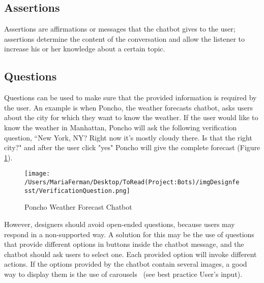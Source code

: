 \documentclass[a4paper,10pt]{article}
\begin{document}
\subsection{Assertions}
Assertions are affirmations or messages that the chatbot gives to the user; assertions determine the content of the conversation and allow the listener to increase his or her knowledge about a certain topic. 

\subsection{Questions}
Questions can be used to make sure that the provided information is required by the user. An example is when Poncho, the weather forecasts chatbot, asks users about the city for which they want to know the weather. If the user would like to know the weather in Manhattan, Poncho will ask the following verification question, ``New York, NY? Right now it's mostly cloudy there. Is that the right city?" and after the user click "yes" Poncho will give the complete forecast (Figure \ref{FigureVerificationQuestion}).


\begin{figure}
\centering
\texttt{[image: /Users/MariaFerman/Desktop/ToRead(Project:Bots)/imgDesignfesst/VerificationQuestion.png]}
\caption{Poncho Weather Forecast Chatbot}
\label{FigureVerificationQuestion}
\end{figure}

However, designers should avoid open-ended questions, because users may respond in a non-supported way. A solution for this may be the use of questions that provide different options in buttons inside the chatbot message, and the chatbot should ask users to select one. Each provided option will invoke different actions. If the options provided by the chatbot contain several images, a good way to display them is the use of carousels~\cite{carousel} (see best practice User's input).

\end{document}
